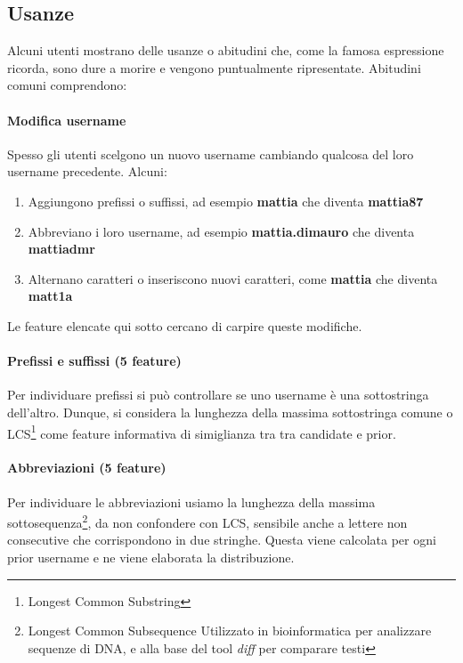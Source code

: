 \subsection{Usanze}
Alcuni utenti mostrano delle usanze o abitudini che, come la famosa espressione ricorda, sono dure a morire e vengono puntualmente ripresentate. Abitudini comuni comprendono:

\paragraph{Modifica username} Spesso gli utenti scelgono un nuovo username cambiando qualcosa del loro username precedente. Alcuni:\newline

\begin{enumerate}
    \item Aggiungono prefissi o suffissi, ad esempio \textbf{mattia} che diventa \textbf{mattia87}
  \item Abbreviano i loro username, ad esempio \textbf{mattia.dimauro} che diventa \textbf{mattiadmr}
  \item Alternano caratteri o inseriscono nuovi caratteri, come \textbf{mattia} che diventa \textbf{matt1a}
\end{enumerate}

Le feature elencate qui sotto cercano di carpire queste modifiche.

\paragraph{Prefissi e suffissi (5 feature)} Per individuare prefissi si può controllare se uno username è una sottostringa dell'altro. Dunque, si considera la lunghezza della massima sottostringa comune o LCS\footnote{Longest Common Substring} come feature informativa di simiglianza tra tra candidate e prior.

\paragraph{Abbreviazioni (5 feature)} Per individuare le abbreviazioni usiamo la lunghezza della massima sottosequenza\footnote{Longest Common Subsequence Utilizzato in bioinformatica per analizzare sequenze di DNA, e alla  base del tool \textit{diff} per comparare testi}, da non confondere con LCS, sensibile anche a lettere non consecutive che corrispondono in due stringhe. Questa viene calcolata per ogni prior username e ne viene elaborata la distribuzione.

